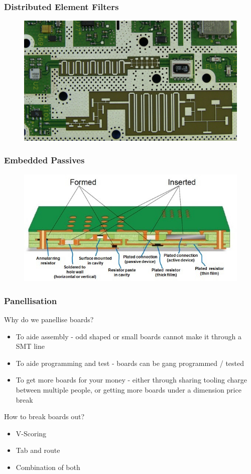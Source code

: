 \documentclass[t]{beamer}
\begin{document}
\begin{frame}
	\frametitle{Distributed Element Filters}
	\begin{figure}
		\includegraphics[width=\linewidth]{distributedFilter.jpg}
	\end{figure}
\end{frame}
\begin{frame}
	\frametitle{Embedded Passives}
	\begin{figure}
		\includegraphics[width=\linewidth]{embedded.jpg}
	\end{figure}
\end{frame}
\begin{frame}
	\frametitle{Panellisation}
	Why do we panellise boards?\\
	\begin{itemize}
		\item To aide assembly - odd shaped or small boards cannot make it through a SMT line
		\item To aide programming and test - boards can be gang programmed / tested
		\item To get more boards for your money - either through sharing tooling charge between multiple people, or getting more boards under a dimension price break
	\end{itemize}
	How to break boards out?
	\begin{itemize}
		\item V-Scoring
		\item Tab and route
		\item Combination of both
	\end{itemize}
\end{frame}
\end{document}
